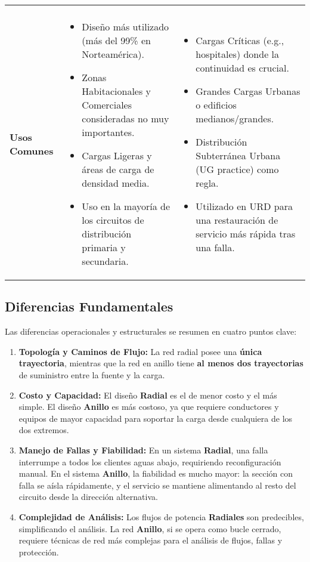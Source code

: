 \begin{table*}[t]
\begin{tabular}{p{} p{} p{}}
\begin{itemize}
    \end{itemize} \\
    \cmidrule(lr){1-3}
    \textbf{Usos Comunes} &
    \begin{itemize}
      \item Diseño más utilizado (más del 99\% en Norteamérica).
      \item Zonas Habitacionales y Comerciales consideradas no muy importantes.
      \item Cargas Ligeras y áreas de carga de densidad media.
      \item Uso en la mayoría de los circuitos de distribución primaria y secundaria.
    \end{itemize} &
    \begin{itemize}
      \item Cargas Críticas (e.g., hospitales) donde la continuidad es crucial.
      \item Grandes Cargas Urbanas o edificios medianos/grandes.
      \item Distribución Subterránea Urbana (UG practice) como regla.
      \item Utilizado en URD para una restauración de servicio más rápida tras una falla.
    \end{itemize} \\
    \bottomrule
  \end{tabular}
\end{table*}


\subsection{Diferencias Fundamentales}

Las diferencias operacionales y estructurales se resumen en cuatro puntos clave:

\begin{enumerate}
\item \textbf{Topología y Caminos de Flujo:} La red radial posee una \textbf{única trayectoria}, mientras que la red en anillo tiene \textbf{al menos dos trayectorias} de suministro entre la fuente y la carga.
\item \textbf{Costo y Capacidad:} El diseño \textbf{Radial} es el de menor costo y el más simple. El diseño \textbf{Anillo} es más costoso, ya que requiere conductores y equipos de mayor capacidad para soportar la carga desde cualquiera de los dos extremos.
\item \textbf{Manejo de Fallas y Fiabilidad:} En un sistema \textbf{Radial}, una falla interrumpe a todos los clientes aguas abajo, requiriendo reconfiguración manual. En el sistema \textbf{Anillo}, la fiabilidad es mucho mayor: la sección con falla se aísla rápidamente, y el servicio se mantiene alimentando al resto del circuito desde la dirección alternativa.
\item \textbf{Complejidad de Análisis:} Los flujos de potencia \textbf{Radiales} son predecibles, simplificando el análisis. La red \textbf{Anillo}, si se opera como bucle cerrado, requiere técnicas de red más complejas para el análisis de flujos, fallas y protección.
\end{enumerate}

